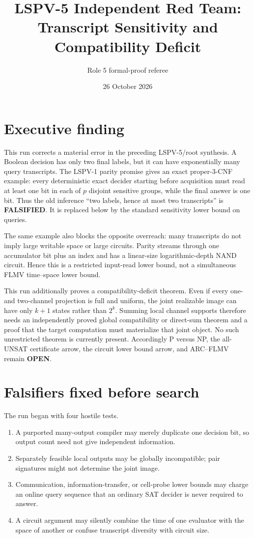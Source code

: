 \documentclass[11pt]{article}
\title{LSPV-5 Independent Red Team: Transcript Sensitivity and Compatibility Deficit}
\author{Role 5 formal-proof referee}
\date{26 October 2026}
\newcommand{\status}[1]{\textbf{#1}}
\begin{document}
\maketitle

\section*{Executive finding}
This run corrects a material error in the preceding LSPV-5/root synthesis.  A
Boolean decision has only two final labels, but it can have exponentially many
query transcripts.  The LSPV-1 parity promise gives an exact proper-3-CNF
example: every deterministic exact decider starting before acquisition must
read at least one bit in each of $p$ disjoint sensitive groups, while the final
answer is one bit.  Thus the old inference ``two labels, hence at most two
transcripts'' is \status{FALSIFIED}.  It is replaced below by the standard
sensitivity lower bound on queries.

The same example also blocks the opposite overreach: many transcripts do not
imply large writable space or large circuits.  Parity streams through one
accumulator bit plus an index and has a linear-size logarithmic-depth NAND
circuit.  Hence this is a restricted input-read lower bound, not a simultaneous
FLMV time--space lower bound.

This run additionally proves a compatibility-deficit theorem.  Even if every
one- and two-channel projection is full and uniform, the joint realizable
image can have only $k+1$ states rather than $2^k$.  Summing local channel
supports therefore needs an independently proved global compatibility or
direct-sum theorem and a proof that the target computation must materialize
that joint object.  No such unrestricted theorem is currently present.
Accordingly P versus NP, the all-UNSAT certificate arrow, the circuit lower
bound arrow, and ARC--FLMV remain \status{OPEN}.

\section*{Falsifiers fixed before search}
The run began with four hostile tests.
\begin{enumerate}
  \item A purported many-output compiler may merely duplicate one decision
        bit, so output count need not give independent information.
  \item Separately feasible local outputs may be globally incompatible; pair
        signatures might not determine the joint image.
  \item Communication, information-transfer, or cell-probe lower bounds may
        charge an online query sequence that an ordinary SAT decider is never
        required to answer.
  \item A circuit argument may silently combine the time of one evaluator with
        the space of another or confuse transcript diversity with circuit size.
\end{enumerate}
\end{document}
